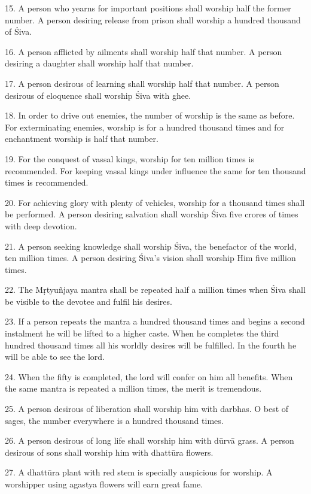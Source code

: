 15. A person who yearns for important positions shall worship half the former
number. A person desiring release from prison shall worship a hundred thousand
 of Śiva.

16. A person afflicted by ailments shall worship half that number. A person
desiring a daughter shall worship half that number.

17. A person desirous of learning shall worship half that number. A person
desirous of eloquence shall worship Śiva with ghee.

18. In order to drive out enemies, the number of worship is the same as before.
For exterminating enemies, worship is for a hundred thousand times and for
enchantment worship is half that number.

19. For the conquest of vassal kings, worship for ten million times is
recommended. For keeping vassal kings under influence the same for ten thousand
times is recommended.

20. For achieving glory with plenty of vehicles, worship for a thousand times
shall be performed. A person desiring salvation shall worship Śiva five crores
of times with deep devotion.

21. A person seeking knowledge shall worship Śiva, the benefactor of the world,
ten million times. A person desiring Śiva’s vision shall worship Him five
million times.

22. The Mṛtyuñjaya mantra shall be repeated half a million times when Śiva shall
be visible to the devotee and fulfil his desires.

23. If a person repeats the mantra a hundred thousand times and begins a second
instalment he will be lifted to a higher caste. When he completes the third
hundred thousand times all his worldly desires will be fulfilled. In the fourth
 he will be able to see the lord.

24. When the fifty  is completed, the lord will confer on him all
benefits. When the same mantra is repeated a million times, the merit is
tremendous.

25. A person desirous of liberation shall worship him with darbhas. O best of
sages, the number everywhere is a hundred thousand times.

26. A person desirous of long life shall worship him with dūrvā grass. A person
desirous of sons shall worship him with dhattūra flowers.

27. A dhattūra plant with red stem is specially auspicious for worship.
A worshipper using agastya flowers will earn great fame.


